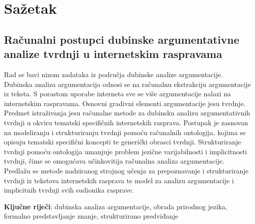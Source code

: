 \section*{Sažetak}

\subsection*{Računalni postupci dubinske argumentativne analize tvrdnji u internetskim raspravama}

Rad se bavi nizom zadataka iz područja dubinske analize argumentacije. 
Dubinska analiza argumentacija odnosi se na računalnu ekstrakciju argumentacije
iz teksta. S porastom uporabe interneta sve se više argumentacije nalazi na
internetskim raspravama. Osnovni gradivni elementi argumentacije jesu tvrdnje.
Predmet istraživanja jesu računalne metode za dubinsku analizu argumentativnih
tvrdnji u okviru tematski specifičnih internetskih rasprava. Postupak je
zasnovan na modeliranju i strukturiranju tvrdnji pomoću računalnih ontologija,
kojima se opisuju tematski specifični koncepti te generički obrasci
tvrdnji. Strukturiranje tvrdnji pomoću ontologija umanjuje problem
jezične varijabilnosti i implicitnosti tvrdnji, čime se omogućava
učinkovitija računalna analiza argumentacije. Predlažu se metode
nadziranog strojnog učenja za prepoznavanje i strukturiranje tvrdnji
iz tekstova internetskih rasprava te model za analizu argumentacije i
implicitnih tvrdnji svih sudionika rasprave.

\vspace{1cm}
\textbf{Ključne riječi}:  
dubinska analiza argumentacije, obrada prirodnog jezika,
formalno predstavljanje znanje, 
strukturirano predviđanje
